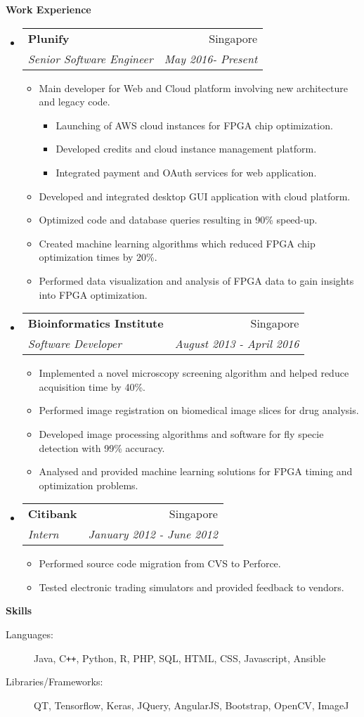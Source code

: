 \documentclass[letterpaper,11pt]{article}
\makeatletter
\newcommand{\resitem}[1]{\item #1 \vspace{-2pt}}
\newcommand{\resheading}[1]{{\large \colorbox{mygrey}{\begin{minipage}{\textwidth}{\textbf{#1 \vphantom{p\^{E}}}}\end{minipage}}}}
\newcommand{\ressubheading}[4]{
\begin{tabular*}{7.0in}{l@{\extracolsep{\fill}}r}
		\textbf{#1} & #2 \\
		\textit{#3} & \textit{#4} \\
\end{tabular*}\vspace{-6pt}}
\makeatother
\begin{document}
\resheading{Work Experience}
\begin{itemize}
\item
	\ressubheading{Plunify}{Singapore}{Senior Software Engineer}{May 2016- Present}
	\begin{itemize}
	    \resitem{Main developer for Web and Cloud platform involving new architecture and legacy code.}
	    \begin{itemize}
			\resitem{Launching of AWS cloud instances for FPGA chip optimization.}
			\resitem{Developed credits and cloud instance management platform.}
			\resitem{Integrated payment and OAuth services for web application.}
	    \end{itemize}
	    \resitem{Developed and integrated desktop GUI application with cloud platform.}
	    \resitem{Optimized code and database queries resulting in 90\% speed-up.}
		\resitem{Created machine learning algorithms which reduced FPGA chip optimization times by 20\%.}
		\resitem{Performed data visualization and analysis of FPGA data to gain insights into FPGA optimization.}
	\end{itemize}
\item
	\ressubheading{Bioinformatics Institute}{Singapore}{Software Developer}{August 2013 - April 2016}
	\begin{itemize}
		\resitem{Implemented a novel microscopy screening algorithm and helped reduce acquisition time by 40\%.}
		\resitem{Performed image registration on biomedical image slices for drug analysis.}
		\resitem{Developed image processing algorithms and	 software for fly specie detection with 99\% accuracy.}
		\resitem{Analysed and provided machine learning solutions for FPGA timing and optimization problems.}
	\end{itemize}
\item
	\ressubheading{Citibank}{Singapore}{Intern}{January 2012 - June 2012}
	\begin{itemize}
		\resitem{Performed source code migration from CVS to Perforce.}
		\resitem{Tested electronic trading simulators and provided feedback to vendors.}
	\end{itemize}
\end{itemize}

\resheading{Skills}

\begin{description}
\item[Languages:]
Java, C{}\verb!++!, Python, R, PHP, SQL, HTML, CSS, Javascript, Ansible
\item[Libraries/Frameworks:]
QT, Tensorflow, Keras, JQuery, AngularJS, Bootstrap, OpenCV, ImageJ
\end{description}
\end{document}
